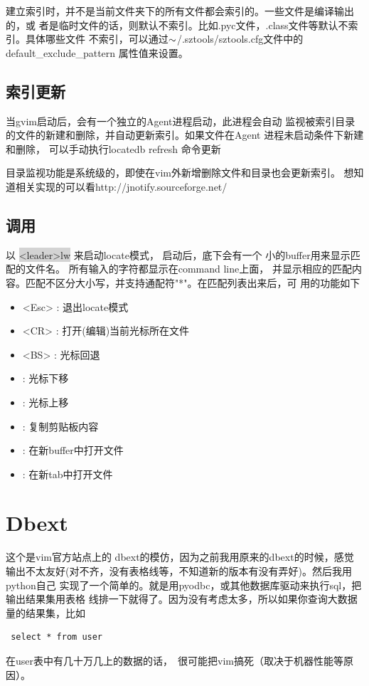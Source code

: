 \documentclass[oneside,openany]{book}
\begin{document}
  建立索引时，并不是当前文件夹下的所有文件都会索引的。一些文件是编译输出的，或
者是临时文件的话，则默认不索引。比如.pyc文件，.class文件等默认不索引。具体哪些文件
不索引，可以通过$\tiny{\sim}$/.sztools/sztools.cfg文件中的default\_exclude\_pattern
属性值来设置。

\subsection{索引更新}
    当gvim启动后，会有一个独立的Agent进程启动，此进程会自动
监视被索引目录的文件的新建和删除，并自动更新索引。如果文件在Agent
进程未启动条件下新建和删除， 可以手动执行locatedb refresh 命令更新

   目录监视功能是系统级的，即使在vim外新增删除文件和目录也会更新索引。
想知道相关实现的可以看http://jnotify.sourceforge.net/

\subsection{调用}
   以 \colorbox{lightgray}{<leader>lw} 来启动locate模式， 启动后，底下会有一个
小的buffer用来显示匹配的文件名。 所有输入的字符都显示在command line上面，
并显示相应的匹配内容。匹配不区分大小写，并支持通配符"*"。在匹配列表出来后，可
用的功能如下
    \begin{itemize}
        \item <Esc> : 退出locate模式
        \item <CR>  : 打开(编辑)当前光标所在文件 
        \item <BS>  : 光标回退
        \item <C-j> : 光标下移
        \item <C-k> : 光标上移
        \item <C-v> : 复制剪贴板内容
        \item <C-b> : 在新buffer中打开文件
        \item <C-t> : 在新tab中打开文件
    \end{itemize}
    

\section{Dbext}

  这个是vim官方站点上的 dbext的模仿，因为之前我用原来的dbext的时候，感觉
输出不太友好(对不齐，没有表格线等，不知道新的版本有没有弄好)。然后我用python自己
实现了一个简单的。就是用pyodbc，或其他数据库驱动来执行sql，把输出结果集用表格
线排一下就得了。因为没有考虑太多，所以如果你查询大数据量的结果集，比如 
\begin{verbatim} select * from user \end{verbatim}
在user表中有几十万几上的数据的话，　很可能把vim搞死（取决于机器性能等原因）。
\end{document}
